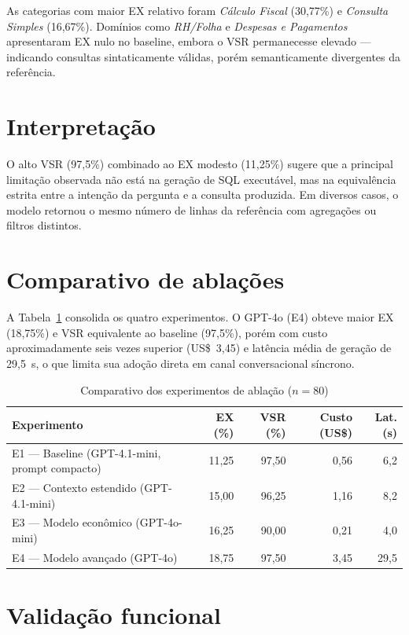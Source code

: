 As categorias com maior EX relativo foram \textit{Cálculo Fiscal} (30,77\%) e \textit{Consulta Simples} (16,67\%). Domínios como \textit{RH/Folha} e \textit{Despesas e Pagamentos} apresentaram EX nulo no baseline, embora o VSR permanecesse elevado --- indicando consultas sintaticamente válidas, porém semanticamente divergentes da referência.

\section{Interpretação}

O alto VSR (97,5\%) combinado ao EX modesto (11,25\%) sugere que a principal limitação observada não está na geração de SQL executável, mas na equivalência estrita entre a intenção da pergunta e a consulta produzida. Em diversos casos, o modelo retornou o mesmo número de linhas da referência com agregações ou filtros distintos.

\section{Comparativo de ablações}

A Tabela~\ref{tab:ablation} consolida os quatro experimentos. O GPT-4o (E4) obteve maior EX (18,75\%) e VSR equivalente ao baseline (97,5\%), porém com custo aproximadamente seis vezes superior (US\$~3,45) e latência média de geração de 29,5~s, o que limita sua adoção direta em canal conversacional síncrono.

\begin{table}[htbp]
\centering
\caption{Comparativo dos experimentos de ablação ($n=80$)}
\label{tab:ablation}
\small
\begin{tabular}{p{4.8cm}rrrr}
\toprule
\textbf{Experimento} & \textbf{EX (\%)} & \textbf{VSR (\%)} & \textbf{Custo (US\$)} & \textbf{Lat. (s)} \\
\midrule
E1 --- Baseline (GPT-4.1-mini, prompt compacto) & 11,25 & 97,50 & 0,56 & 6,2 \\
E2 --- Contexto estendido (GPT-4.1-mini) & 15,00 & 96,25 & 1,16 & 8,2 \\
E3 --- Modelo econômico (GPT-4o-mini) & 16,25 & 90,00 & 0,21 & 4,0 \\
E4 --- Modelo avançado (GPT-4o) & 18,75 & 97,50 & 3,45 & 29,5 \\
\bottomrule
\end{tabular}
\end{table}

\section{Validação funcional}

